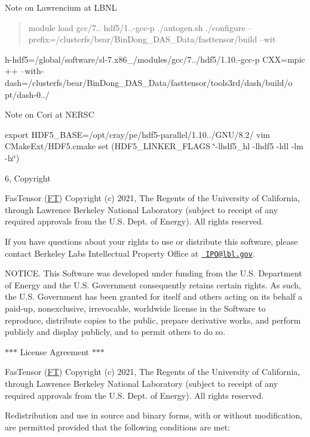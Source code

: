 Note on Lawrencium at LBNL

\begin{quote}
module load gcc/7.. hdf5/1..-\/gcc-\/p ./autogen.sh ./configure --prefix=/clusterfs/bear/\+Bin\+Dong\+\_\+\+DAS\+\_\+\+Data/fasttensor/build --wit \end{quote}
h-\/hdf5=/global/software/sl-\/7.x86\+\_/modules/gcc/7../hdf5/1.10.-\/gcc-\/p CXX=mpic ++ --with-\/dash=/clusterfs/bear/\+Bin\+Dong\+\_\+\+DAS\+\_\+\+Data/fasttensor/tools3rd/dash/build/o pt/dash-\/0../

Note on Cori at NERSC

export HDF5\+\_\+\+BASE=/opt/cray/pe/hdf5-\/parallel/1.10../\+GNU/8.2/ vim CMake\+Ext/\+HDF5.\+cmake set (HDF5\+\_\+\+LINKER\+\_\+\+FLAGS \char`\"{}-\/lhdf5\+\_\+hl -\/lhdf5 -\/ldl -\/lm -\/lz\char`\"{})

6, Copyright



Fas\+Tensor (\mbox{\hyperlink{namespace_f_t}{FT}}) Copyright (c) 2021, The Regents of the University of California, through Lawrence Berkeley National Laboratory (subject to receipt of any required approvals from the U.\+S. Dept. of Energy). All rights reserved.

If you have questions about your rights to use or distribute this software, please contact Berkeley Lab\textquotesingle{}s Intellectual Property Office at \href{mailto:IPO@lbl.gov}{\texttt{ IPO@lbl.\+gov}}.

NOTICE. This Software was developed under funding from the U.\+S. Department of Energy and the U.\+S. Government consequently retains certain rights. As such, the U.\+S. Government has been granted for itself and others acting on its behalf a paid-\/up, nonexclusive, irrevocable, worldwide license in the Software to reproduce, distribute copies to the public, prepare derivative works, and perform publicly and display publicly, and to permit others to do so.



$\ast$$\ast$$\ast$ License Agreement $\ast$$\ast$$\ast$

Fas\+Tensor (\mbox{\hyperlink{namespace_f_t}{FT}}) Copyright (c) 2021, The Regents of the University of California, through Lawrence Berkeley National Laboratory (subject to receipt of any required approvals from the U.\+S. Dept. of Energy). All rights reserved.

Redistribution and use in source and binary forms, with or without modification, are permitted provided that the following conditions are met\+:

